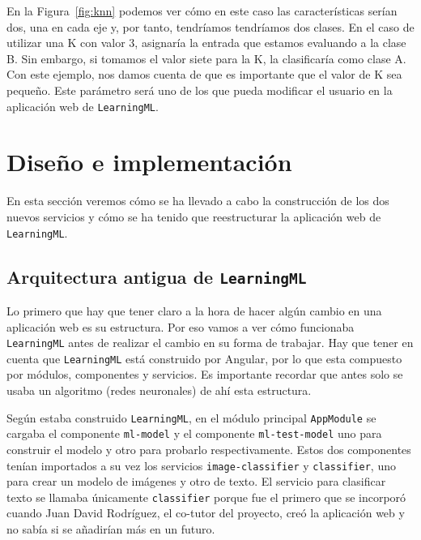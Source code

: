 \documentclass[a4paper, 12pt]{book}
\begin{document}
En la Figura~\ref{fig:knn} podemos ver cómo en este caso las características serían dos, una en cada eje y, por tanto, tendríamos tendríamos dos clases. En el caso de utilizar una K con valor 3, asignaría la entrada que estamos evaluando a la clase B. Sin embargo, si tomamos el valor siete para la K, la clasificaría como clase A. Con este ejemplo, nos damos cuenta de que es importante que el valor de K sea pequeño. Este parámetro será uno de los que pueda modificar el usuario en la aplicación web de \texttt{LearningML}.



\cleardoublepage
\chapter{Diseño e implementación}

En esta sección veremos cómo se ha llevado a cabo la construcción de los dos nuevos servicios y cómo se ha tenido que reestructurar la aplicación web de \texttt{LearningML}.

\section{Arquitectura antigua de \texttt{LearningML}} 
\label{sec:arquitecturaantigua}

Lo primero que hay que tener claro a la hora de hacer algún cambio en una aplicación web es su estructura.
Por eso vamos a ver cómo funcionaba \texttt{LearningML} antes de realizar el cambio en su forma de trabajar. Hay que tener en cuenta que \texttt{LearningML} está construido por Angular, por lo que esta compuesto por módulos, componentes y servicios. Es importante recordar que antes solo se usaba un algoritmo (redes neuronales) de ahí esta estructura.

Según estaba construido \texttt{LearningML}, en el módulo principal \texttt{AppModule} se cargaba el componente \texttt{ml-model} y el componente \texttt{ml-test-model} uno para construir el modelo y otro para probarlo respectivamente. Estos dos componentes tenían importados a su vez los servicios \texttt{image-classifier} y \texttt{classifier}, uno para crear un modelo de imágenes y otro de texto. El servicio para clasificar texto se llamaba únicamente \texttt{classifier} porque fue el primero que se incorporó cuando Juan David Rodríguez, el co-tutor del proyecto, creó la aplicación web y no sabía si se añadirían más en un futuro.
\end{document}
